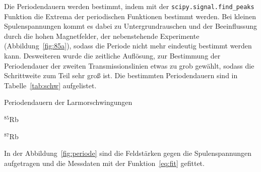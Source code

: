 Die Periodendauern werden bestimmt, indem mit der \texttt{scipy.signal.find\_peaks}
Funktion die Extrema der periodischen Funktionen bestimmt werden. 
Bei kleinen Spulenspannungen kommt es dabei zu Untergrundrauschen und der
Beeinflussung durch die hohen Magnetfelder, der nebenstehende Experimente 
(Abbildung~\ref{fig:85a}), sodass die Periode nicht mehr eindeutig 
bestimmt werden kann. 
Desweiteren wurde die zeitliche Auflösung, zur Bestimmung der Periodendauer
der zweiten Transmissionslinien etwas zu grob gewählt, sodass die 
Schrittweite zum Teil sehr groß ist.
Die bestimmten Periodendauern sind in Tabelle~\ref{tab:schw} aufgelistet.
\begin{table}[h]
	\centering
	\caption{Periodendauern der Larmorschwingungen}
	\label{tab:schw}
	\begin{subtable}[t]{0.4\textwidth}
	\centering
	\caption{$^{85}$Rb}
		
	\end{subtable}
	\begin{subtable}[t]{0.4\textwidth}
	\centering
	\caption{$^{87}$Rb}
		
	\end{subtable}
\end{table}
In der Abbildung~\ref{fig:periode} sind die Feldstärken gegen die Spulenspannungen
aufgetragen und die Messdaten mit der Funktion~\ref{eq:fit} gefittet.
